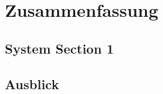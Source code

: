 %
\chapter{Zusammenfassung}
\label{sec:conclusion}


\section{System Section 1}
\label{sec:conclusion:sec1}


\section{Ausblick}
\label{sec:conclusion:future}

